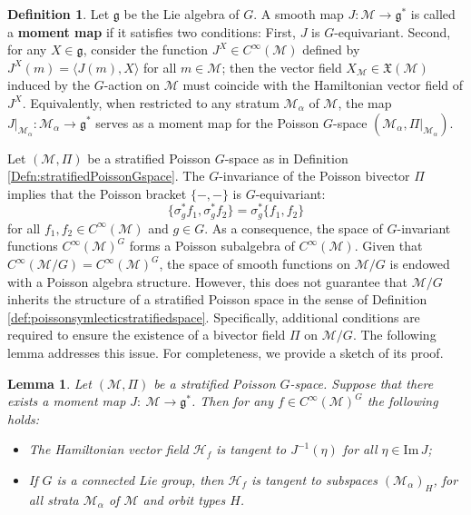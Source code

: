 \documentclass[12pt]{amsart}
\newtheorem{lemma}[theorem]{Lemma}
\theoremstyle{definition}
\newtheorem{definition}[theorem]{Definition}
\numberwithin{equation}{section}
\def\Im{\mathrm{Im}\,}
\newcommand{\Hamiltonian}[1]{\mathcal{H}_{#1}}
\newcommand{\gstar}{\mathfrak{g}^*}
\newcommand{\galgebra}{\mathfrak{g}}
\newcommand{\CinfcalM}{C^\infty(\mathcal{M})}
\newcommand{\Cinf}{C^\infty}
\newcommand{\PoissonBracket}[1]{\{#1\}}
\begin{document}
\begin{definition}\label{Defn:momentmapofstratifiedPoissonGspace}Let $\galgebra$ be the Lie algebra of $G$. A smooth map $J: \mathcal{M} \to \gstar$ is called a  \textbf{moment map}  if it satisfies two conditions: First, $J$ is $G$-equivariant. Second, for any $X \in \galgebra$, consider the function $J^X \in \Cinf(\mathcal{M})$ defined by $J^X(m) = \langle J(m), X \rangle$ for all $m \in \mathcal{M}$; then the vector field $X_\mathcal{M} \in \mathfrak{X}(\mathcal{M})$ induced by the $G$-action on $\mathcal{M}$ must coincide with the Hamiltonian vector field of $J^X$. Equivalently, when restricted to any stratum $\mathcal{M}_{\alpha}$ of $\mathcal{M}$, the map $J|_{\mathcal{M}_{\alpha}}: \mathcal{M}_{\alpha} \to \gstar$ serves as a moment map for the Poisson $G$-space $(\mathcal{M}_{\alpha}, \Pi|_{\mathcal{M}_{\alpha}})$.
\end{definition}
	
Let $(\mathcal{M}, \Pi)$ be a stratified Poisson $G$-space as   in Definition \ref{Defn:stratifiedPoissonGspace}. The $G$-invariance of the Poisson bivector $\Pi$ implies that the  Poisson bracket $\PoissonBracket{-,-}$ is $G$-equivariant:
	$$\PoissonBracket{\sigma_g^*f_1,\sigma_g^*f_2}=\sigma_g^*\PoissonBracket{f_1,f_2}$$
	for all $f_1,f_2\in \Cinf(\mathcal{M})$ and $g\in G$.
	As a consequence, the space of $G$-invariant functions $\Cinf(\mathcal{M})^G$ forms a Poisson subalgebra of $\CinfcalM$. Given that $\Cinf(\mathcal{M}/G)=\Cinf(\mathcal{M})^G$,   the space of smooth functions on $\mathcal{M}/G$ is endowed with a Poisson algebra structure. However, this   does not guarantee that $\mathcal{M}/G$ inherits the structure of a stratified Poisson space in the sense of Definition \ref{def:poissonsymlecticstratifiedspace}. Specifically, additional conditions are required to ensure the existence of a bivector field $\Pi$ on $\mathcal{M}/G$. The following lemma  addresses this issue. For completeness, we provide a sketch of its proof.
	
	
	
	\begin{lemma}\label{lemma:tangentproperty} Let $(\mathcal{M} ,\Pi)$ be a stratified Poisson $G$-space. Suppose that there exists a  moment map $J:~\mathcal{M}\to \gstar$. Then for any $f\in \CinfcalM^G$  the following holds:
		\begin{itemize}
			\item[(1)]The Hamiltonian vector field $\Hamiltonian{f}$  is tangent to   $J^{-1}(\eta)$   for all $ \eta\in \Im J$;
			\item[(2)]If $G$ is a connected Lie group, then   $\Hamiltonian{f}$  is tangent to subspaces   $(\mathcal{M}_{\alpha})_H$, for all strata $\mathcal{M}_{\alpha}$ of $\mathcal{M}$ and orbit types $H$.
		\end{itemize}
	\end{lemma}
	
\end{document}
